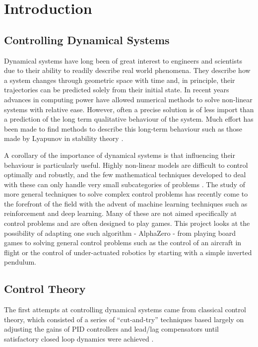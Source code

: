 \documentclass[../main.tex]{subfiles}
\begin{document}
\chapter{Introduction}

\section{Controlling Dynamical Systems}
Dynamical systems have long been of great interest to engineers and scientists due to their ability to readily describe real world phenomena. They describe how a system changes through geometric space with time and, in principle, their trajectories can be predicted solely from their initial state. In recent years advances in computing power have allowed numerical methods to solve non-linear systems with relative ease. However, often a precise solution is of less import than a prediction of the long term qualitative behaviour of the system. Much effort has been made to find methods to describe this long-term behaviour such as those made by Lyapunov in stability theory \cite{4f2}. 

A corollary of the importance of dynamical systems is that influencing their behaviour is particularly useful. Highly non-linear models are difficult to control optimally and robustly, and the few mathematical techniques developed to deal with these can only handle very small subcategories of problems \cite{4f2, 4f3}. The study of more general techniques to solve complex control problems has recently come to the forefront of the field with the advent of machine learning techniques such as reinforcement and deep learning. Many of these are not aimed specifically at control problems and are often designed to play games. This project looks at the possibility of adapting one such algorithm - AlphaZero - from playing board games to solving general control problems such as the control of an aircraft in flight or the control of under-actuated robotics by starting with a simple inverted pendulum.

\section{Control Theory}
The first attempts at controlling dynamical systems came from classical control theory, which consisted of a series of ``cut-and-try'' techniques based largely on adjusting the gains of PID controllers and lead/lag compensators until satisfactory closed loop dynamics were achieved \cite{History}.
\end{document}
